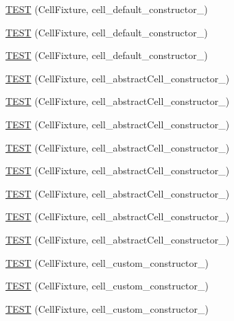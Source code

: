 \begin{DoxyCompactItemize}
\item 
\hyperlink{TestLife_8c_09_09_a07dfb3723ef1406df4bb0900ab5c3491}{T\-E\-S\-T} (Cell\-Fixture, cell\-\_\-default\-\_\-constructor\-\_)
\item 
\hyperlink{TestLife_8c_09_09_addd9019ee5a3d4005ad6d0a72afd0c31}{T\-E\-S\-T} (Cell\-Fixture, cell\-\_\-default\-\_\-constructor\-\_)
\item 
\hyperlink{TestLife_8c_09_09_aa06ceb13f0a8a615783ff69d6e82b629}{T\-E\-S\-T} (Cell\-Fixture, cell\-\_\-default\-\_\-constructor\-\_)
\item 
\hyperlink{TestLife_8c_09_09_a5e251ab89b588434b5935c5b7a63ab20}{T\-E\-S\-T} (Cell\-Fixture, cell\-\_\-abstract\-Cell\-\_\-constructor\-\_)
\item 
\hyperlink{TestLife_8c_09_09_a9e21b7ebd889cf400281d244bd18376b}{T\-E\-S\-T} (Cell\-Fixture, cell\-\_\-abstract\-Cell\-\_\-constructor\-\_)
\item 
\hyperlink{TestLife_8c_09_09_a94ccfd749211d36c7279bb7d1075cd82}{T\-E\-S\-T} (Cell\-Fixture, cell\-\_\-abstract\-Cell\-\_\-constructor\-\_)
\item 
\hyperlink{TestLife_8c_09_09_a67e9026bcd717e19b7ba7a4df9ad400c}{T\-E\-S\-T} (Cell\-Fixture, cell\-\_\-abstract\-Cell\-\_\-constructor\-\_)
\item 
\hyperlink{TestLife_8c_09_09_a704254ff5e55befb3957b57f80f0551e}{T\-E\-S\-T} (Cell\-Fixture, cell\-\_\-abstract\-Cell\-\_\-constructor\-\_)
\item 
\hyperlink{TestLife_8c_09_09_a4b310f8cfe5ce4beb15d40bab4296d8e}{T\-E\-S\-T} (Cell\-Fixture, cell\-\_\-abstract\-Cell\-\_\-constructor\-\_)
\item 
\hyperlink{TestLife_8c_09_09_a8999e664efa1fc6cc3b323b54165f78d}{T\-E\-S\-T} (Cell\-Fixture, cell\-\_\-abstract\-Cell\-\_\-constructor\-\_)
\item 
\hyperlink{TestLife_8c_09_09_ab2b3084f8b8d3c0ce64caeb8109ec505}{T\-E\-S\-T} (Cell\-Fixture, cell\-\_\-abstract\-Cell\-\_\-constructor\-\_)
\item 
\hyperlink{TestLife_8c_09_09_ab2568b1291e1c89a398ffba18f873caa}{T\-E\-S\-T} (Cell\-Fixture, cell\-\_\-custom\-\_\-constructor\-\_)
\item 
\hyperlink{TestLife_8c_09_09_a5e47739504022e04ed73126ebcfd9f6e}{T\-E\-S\-T} (Cell\-Fixture, cell\-\_\-custom\-\_\-constructor\-\_)
\item 
\hyperlink{TestLife_8c_09_09_aeb834b4af9c0919f4c392e9d990f5ee7}{T\-E\-S\-T} (Cell\-Fixture, cell\-\_\-custom\-\_\-constructor\-\_)

\end{DoxyCompactItemize}
